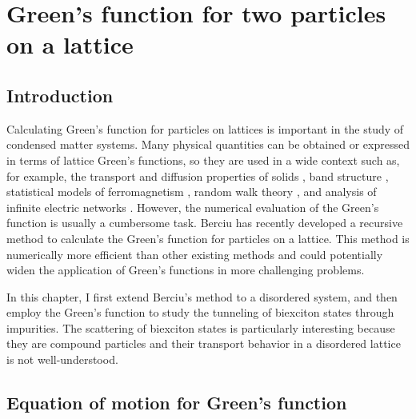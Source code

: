 \chapter{Green's function for two particles on a lattice}
\label{ch:greenfunc}

\section{Introduction}
\label{sec:introGreenFunc}

Calculating Green's function for particles on lattices is  important in the study of condensed matter systems. Many physical
quantities can be obtained or expressed in terms of lattice Green's functions, so they are used in a wide
context such as, for example, the transport and diffusion properties of solids \cite{economou2006}, band structure 
\cite{koster1954}, statistical models 
of ferromagnetism \cite{mccoy1978, dalton1967, lax1952}, random walk theory \cite{montroll1965},  and analysis of 
infinite electric networks \cite{cserti2000, cserti2002, asad2004, asad2005}. 
However, the numerical evaluation of the Green's function is usually a cumbersome task\cite{Berciu2010}. 
Berciu has recently developed a recursive method \cite{Berciu2010, Berciu2011, Berciu2012} to calculate the Green's function for particles on a lattice. 
This
method is numerically more efficient than other existing methods and could potentially widen the application of 
Green's functions in more challenging problems. 

In this chapter, I first extend Berciu's method to a disordered system, and then  employ the Green's 
function to study the tunneling of biexciton states through impurities. The scattering of biexciton states is particularly
interesting because they are compound particles and their transport behavior in a disordered lattice
is not well-understood\cite{bulatov2005}.

\section{Equation of motion for Green's function}
\label{sec:equationOfMotion}


